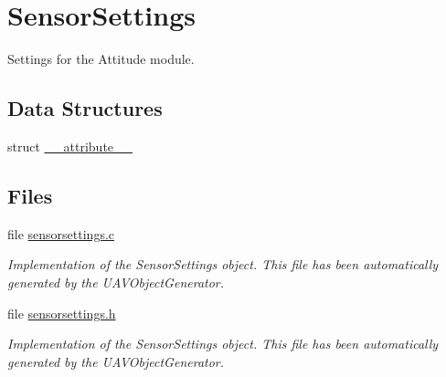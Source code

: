 \hypertarget{group___sensor_settings}{\section{\-Sensor\-Settings}
\label{group___sensor_settings}
}


\-Settings for the \-Attitude module.  


\subsection*{\-Data \-Structures}
\begin{DoxyCompactItemize}
\item 
struct \hyperlink{struct____attribute____}{\-\_\-\-\_\-attribute\-\_\-\-\_\-}
\end{DoxyCompactItemize}
\subsection*{\-Files}
\begin{DoxyCompactItemize}
\item 
file \hyperlink{sensorsettings_8c}{sensorsettings.\-c}
\begin{DoxyCompactList}\small\item\em \-Implementation of the \-Sensor\-Settings object. \-This file has been automatically generated by the \-U\-A\-V\-Object\-Generator. \end{DoxyCompactList}\item 
file \hyperlink{sensorsettings_8h}{sensorsettings.\-h}
\begin{DoxyCompactList}\small\item\em \-Implementation of the \-Sensor\-Settings object. \-This file has been automatically generated by the \-U\-A\-V\-Object\-Generator. \end{DoxyCompactList}\end{DoxyCompactItemize}
